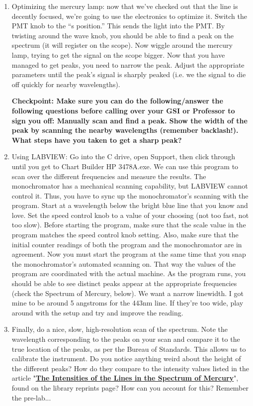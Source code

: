 \documentclass{../lab}
\begin{document}
\begin{enumerate}
    \item Optimizing the mercury lamp: now that we've checked out that the line is decently focused, we're going to use the electronics to optimize it. Switch the PMT knob to the ``s position.'' This sends the light into the PMT. By twisting around the wave knob, you should be able to find a peak on the spectrum (it will register on the scope). Now wiggle around the mercury lamp, trying to get the signal on the scope bigger. Now that you have managed to get peaks, you need to narrow the peak. Adjust the appropriate parameters until the peak's signal is sharply peaked (i.e. we the signal to die off quickly for nearby wavelengths).
    
    \textbf{Checkpoint: Make sure you can do the following/answer the following questions
    before calling over your GSI or Professor to sign you off: Manually scan and find a peak. Show the width of the peak by scanning the nearby wavelengths (remember backlash!). What steps have you taken to get a sharp peak?}
    
    \item Using LABVIEW:
    Go into the C drive, open Support, then click through until you get to Chart Builder HP 3478A.exe. We can use this program to scan over the different frequencies and measure the results. The monochromator has a mechanical scanning capability, but LABVIEW cannot control it. Thus, you have to sync up the monochromator's scanning with the program. Start at a wavelength below the bright blue line that you know and love. Set the speed control knob to a value of your choosing (not too fast, not too slow). Before starting the program, make sure that the scale value in the program matches the speed control knob setting. Also, make sure that the initial counter readings of both the program and the monochromator are in agreement. Now you must start the program at the same time that you snap the monochromator's automated scanning on. That way the values of the program are coordinated with the actual machine. As the program runs, you should be able to see distinct peaks appear at the appropriate frequencies (check the Spectrum of Mercury, below). We want a narrow linewidth. I got mine to be around 5 angstroms for the 443nm line. If they're too wide, play around with the setup and try and improve the reading.
    
    \item Finally, do a nice, slow, high-resolution scan of the spectrum. Note the wavelength corresponding to the peaks on your scan and compare it to the true location of the peaks, as per the Bureau of Standards. This allows us to calibrate the instrument. Do you notice anything weird about the height of the different peaks? How do they compare to the intensity values listed in the article "\href{http://physics111.lib.berkeley.edu/Physics111/Reprints/ATM/ATM\%20Yellow\%20lines_p593_1.pdf}{\textbf{The Intensities of the Lines in the Spectrum of Mercury}}", found on the library reprints page? How can you account for this? Remember the pre-lab...
\end{enumerate}
\end{document}
